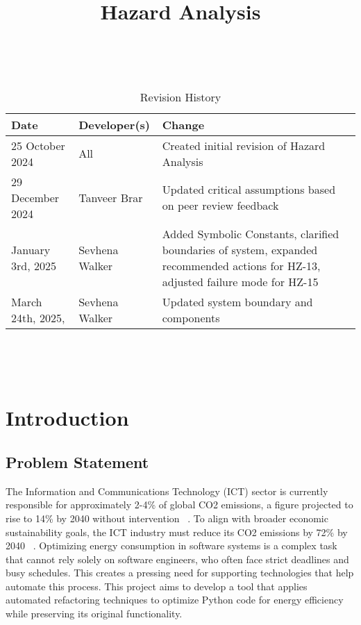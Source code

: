 \documentclass{article}
\title{Hazard Analysis\\\progname}
\author{\authname}
\date{}
\begin{document}
\maketitle
\thispagestyle{empty}

~\newpage


\begin{table}[hp]
\caption{Revision History} \label{TblRevisionHistory}
\begin{tabularx}{\textwidth}{ll>{\raggedright\arraybackslash}X}
\toprule
\textbf{Date} & \textbf{Developer(s)} & \textbf{Change}\\
\midrule
25 October 2024 & All & Created initial revision of Hazard Analysis\\
29 December 2024 & Tanveer Brar & Updated critical assumptions based on peer review feedback\\
January 3rd, 2025 & Sevhena Walker & Added Symbolic Constants, clarified boundaries of system, expanded recommended actions for HZ-13, adjusted failure mode for HZ-15 \\
March 24th, 2025, & Sevhena Walker & Updated system boundary and components\\
\bottomrule
\end{tabularx}
\end{table}

~\newpage

\tableofcontents

~\newpage




\section{Introduction}

\subsection{Problem Statement}
The Information and Communications Technology (ICT) sector is currently responsible
for approximately 2-4\% of global CO2 emissions, a figure projected to rise to 14\% 
by 2040 without intervention ~\citep{BelkhirAndElmeligi2018}. To align with broader 
economic sustainability goals, the ICT industry must reduce its CO2 emissions by 72\% 
by 2040 ~\citep{FreitagAndBernersLee2021}. Optimizing energy consumption in software 
systems is a complex task that cannot rely solely on software engineers, who often 
face strict deadlines and busy schedules. This creates a pressing need for supporting 
technologies that help automate this process. This project aims to develop a tool that 
applies automated refactoring techniques to optimize Python code for energy efficiency 
while preserving its original functionality. 
\end{document}
